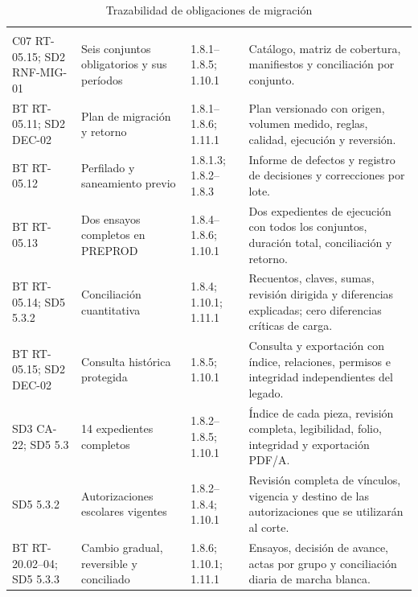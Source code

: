 \begingroup
\setlength{\tabcolsep}{3pt}
\begin{longtable}{L{\dimexpr.20\tabcolsep\relax}L{\dimexpr.23\tabcolsep\relax}L{\dimexpr.22\tabcolsep\relax}L{\dimexpr.35\tabcolsep\relax}}
\caption{Trazabilidad de obligaciones de migración}\label{tab:sd7-trazabilidad-migracion}\\
\hline
  &  &  & \\\hline
\endfirsthead
\hline
  &  &  & \\\hline
\endhead
C07 RT-05.15; SD2 RNF-MIG-01 & Seis conjuntos obligatorios y sus períodos & 1.8.1--1.8.5; 1.10.1 & Catálogo, matriz de cobertura, manifiestos y conciliación por conjunto.\\\hline
BT RT-05.11; SD2 DEC-02 & Plan de migración y retorno & 1.8.1--1.8.6; 1.11.1 & Plan versionado con origen, volumen medido, reglas, calidad, ejecución y reversión.\\\hline
BT RT-05.12 & Perfilado y saneamiento previo & 1.8.1.3; 1.8.2--1.8.3 & Informe de defectos y registro de decisiones y correcciones por lote.\\\hline
BT RT-05.13 & Dos ensayos completos en PREPROD & 1.8.4--1.8.6; 1.10.1 & Dos expedientes de ejecución con todos los conjuntos, duración total, conciliación y retorno.\\\hline
BT RT-05.14; SD5 5.3.2 & Conciliación cuantitativa & 1.8.4; 1.10.1; 1.11.1 & Recuentos, claves, sumas, revisión dirigida y diferencias explicadas; cero diferencias críticas de carga.\\\hline
BT RT-05.15; SD2 DEC-02 & Consulta histórica protegida & 1.8.5; 1.10.1 & Consulta y exportación con índice, relaciones, permisos e integridad independientes del legado.\\\hline
SD3 CA-22; SD5 5.3 & 14 expedientes completos & 1.8.2--1.8.5; 1.10.1 & Índice de cada pieza, revisión completa, legibilidad, folio, integridad y exportación PDF/A.\\\hline
SD5 5.3.2 & Autorizaciones escolares vigentes & 1.8.2--1.8.4; 1.10.1 & Revisión completa de vínculos, vigencia y destino de las autorizaciones que se utilizarán al corte.\\\hline
BT RT-20.02--04; SD5 5.3.3 & Cambio gradual, reversible y conciliado & 1.8.6; 1.10.1; 1.11.1 & Ensayos, decisión de avance, actas por grupo y conciliación diaria de marcha blanca.\\\hline
\end{longtable}
\endgroup

